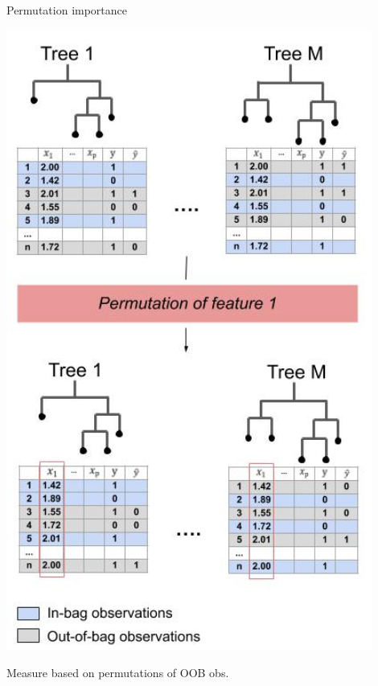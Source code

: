 \documentclass[11pt,compress,t,notes=noshow, xcolor=table]{beamer}
\begin{document}
\begin{vbframe}{Permutation importance}

\begin{minipage}[b]{0.35\textwidth}

\includegraphics[width = 0.9\textwidth]{figure_man/forests-featimp-new}
\end{minipage}%
\begin{minipage}[b]{0.65\textwidth}
\begin{algorithm}[H]
\scriptsize
\caption*{\small{Measure based on permutations of OOB obs.}}
\begin{algorithmic}[1]

\end{algorithmic}
\end{algorithm}
\end{minipage}
\end{vbframe}
\end{document}
